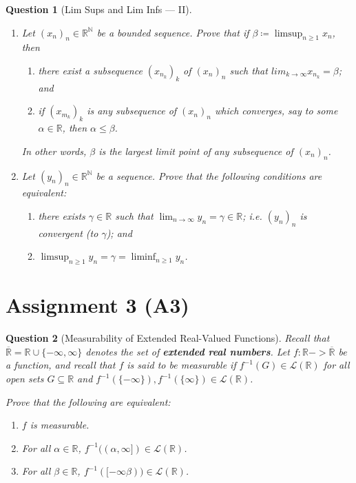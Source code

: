 \documentclass[notoc,notitlepage]{tufte-book}
\newtheorem{assgprob}{Question}[section]
\begin{document}
\begin{assgprob}[Lim Sups and Lim Infs --- II]
  \begin{enumerate}
    \item Let $(x_n)_n \in \mathbb{R}^{\mathbb{N}}$ be a bounded sequence.
      Prove that if $\beta \coloneqq \limsup_{n \geq 1} x_n$, then
      \begin{enumerate}
        \item there exist a subsequence $(x_{n_k})_k$ of
          $(x_n)_n$ such that $lim_{k \to \infty} x_{n_k} = \beta$;
          and
        \item if $(x_{m_k})_k$ is any subsequence of $(x_n)_n$ which converges,
          say to some $\alpha \in \mathbb{R}$, then $\alpha \leq \beta$.
      \end{enumerate}
      In other words, $\beta$ is the largest limit point of any subsequence
      of $(x_n)_n$.

    \item Let $(y_n)_n \in \mathbb{R}^{\mathbb{N}}$ be a sequence.
      Prove that the following conditions are equivalent:
      \begin{enumerate}
        \item there exists $\gamma \in \mathbb{R}$ such that
          $\lim_{n \to \infty} y_n = \gamma \in \mathbb{R}$;
          i.e. $(y_n)_n$ is convergent (to $\gamma$); and
        \item $\limsup_{n \geq 1} y_n = \gamma = \liminf_{n \geq 1} y_n$.
      \end{enumerate}
  \end{enumerate}
\end{assgprob}

\newpage

\section{Assignment 3 (A3)}%
\label{sec:assignment_3}

\begin{assgprob}[Measurability of Extended Real-Valued Functions]
  Recall that $\overline{\mathbb{R}} = \mathbb{R} \cup \{ - \infty, \infty \}$
  denotes the set of \textbf{extended real numbers}.
  Let $f : \mathbb{R} -> \overline{\mathbb{R}}$ be a function,
  and recall that $f$ is said to be measurable if
  $f^{-1}(G) \in \mathcal{L}(\mathbb{R})$ for all open sets $G \subseteq \mathbb{R}$
  and $f^{-1}(\{-\infty\}), f^{-1}(\{\infty\}) \in \mathcal{L}(\mathbb{R})$.

  Prove that the following are equivalent:
  \begin{enumerate}
    \item $f$ is measurable.
    \item For all $\alpha \in \mathbb{R}$,
      $f^{-1}((\alpha, \infty]) \in \mathcal{L}(\mathbb{R})$.
    \item For all $\beta \in \mathbb{R}$,
      $f^{-1}([-\infty \beta)) \in \mathcal{L}(\mathbb{R})$.
  \end{enumerate}
\end{assgprob}
\end{document}
